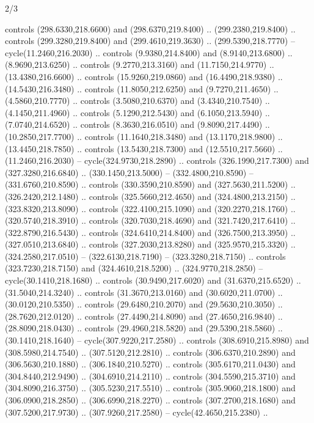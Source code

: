 \begin{flagdescription}{2/3}
\begin{scope}[xshift=0.5\flaglength,yshift=0.5\flagwidth,scale=\stretchfactor]
\begin{scope}[scale=0.001645\flagwidth,yshift=65mm,xshift=-63mm]
\begin{scope}[y=0.80pt, x=0.80pt, yscale=-1,]
\begin{scope}[cm={{1.33333,0.0,0.0,1.33333,(0.0,1e-05)}}]
  controls (298.6330,218.6600) and (298.6370,219.8400) .. (299.2380,219.8400) ..
  controls (299.3280,219.8400) and (299.4610,219.3630) .. (299.5390,218.7770) --
  cycle(11.2460,216.2030) .. controls (9.9380,214.8400) and (8.9140,213.6800) ..
  (8.9690,213.6250) .. controls (9.2770,213.3160) and (11.7150,214.9770) ..
  (13.4380,216.6600) .. controls (15.9260,219.0860) and (16.4490,218.9380) ..
  (14.5430,216.3480) .. controls (11.8050,212.6250) and (9.7270,211.4650) ..
  (4.5860,210.7770) .. controls (3.5080,210.6370) and (3.4340,210.7540) ..
  (4.1450,211.4960) .. controls (5.1290,212.5430) and (6.1050,213.5940) ..
  (7.0740,214.6520) .. controls (8.3630,216.0510) and (9.8090,217.4490) ..
  (10.2850,217.7700) .. controls (11.1640,218.3480) and (13.1170,218.9800) ..
  (13.4450,218.7850) .. controls (13.5430,218.7300) and (12.5510,217.5660) ..
  (11.2460,216.2030) -- cycle(324.9730,218.2890) .. controls (326.1990,217.7300)
  and (327.3280,216.6840) .. (330.1450,213.5000) -- (332.4800,210.8590) --
  (331.6760,210.8590) .. controls (330.3590,210.8590) and (327.5630,211.5200) ..
  (326.2420,212.1480) .. controls (325.5660,212.4650) and (324.4800,213.2150) ..
  (323.8320,213.8090) .. controls (322.4100,215.1090) and (320.2270,218.1760) ..
  (320.5740,218.3910) .. controls (320.7030,218.4690) and (321.7420,217.6410) ..
  (322.8790,216.5430) .. controls (324.6410,214.8400) and (326.7500,213.3950) ..
  (327.0510,213.6840) .. controls (327.2030,213.8280) and (325.9570,215.3320) ..
  (324.2580,217.0510) -- (322.6130,218.7190) -- (323.3280,218.7150) .. controls
  (323.7230,218.7150) and (324.4610,218.5200) .. (324.9770,218.2850) --
  cycle(30.1410,218.1680) .. controls (30.9490,217.6020) and (31.6370,215.6520)
  .. (31.5040,214.3240) .. controls (31.3670,213.0160) and (30.6020,211.0700) ..
  (30.0120,210.5350) .. controls (29.6480,210.2070) and (29.5630,210.3050) ..
  (28.7620,212.0120) .. controls (27.4490,214.8090) and (27.4650,216.9840) ..
  (28.8090,218.0430) .. controls (29.4960,218.5820) and (29.5390,218.5860) ..
  (30.1410,218.1640) -- cycle(307.9220,217.2580) .. controls (308.6910,215.8980)
  and (308.5980,214.7540) .. (307.5120,212.2810) .. controls (306.6370,210.2890)
  and (306.5630,210.1880) .. (306.1840,210.5270) .. controls (305.6170,211.0430)
  and (304.8440,212.9490) .. (304.6910,214.2110) .. controls (304.5590,215.3710)
  and (304.8090,216.3750) .. (305.5230,217.5510) .. controls (305.9060,218.1800)
  and (306.0900,218.2850) .. (306.6990,218.2270) .. controls (307.2700,218.1680)
  and (307.5200,217.9730) .. (307.9260,217.2580) -- cycle(42.4650,215.2380) ..

\end{scope}
\end{scope}
\end{scope}
\end{scope}
\end{flagdescription}
